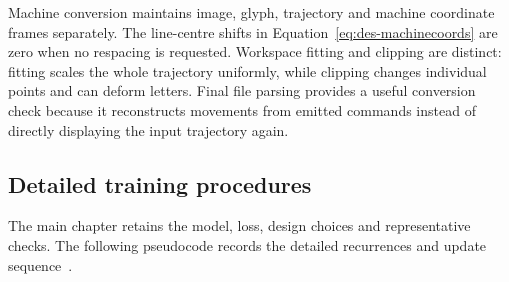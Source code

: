 Machine conversion maintains image, glyph, trajectory and machine coordinate frames separately. The line-centre shifts in Equation~\ref{eq:des-machinecoords} are zero when no respacing is requested. Workspace fitting and clipping are distinct: fitting scales the whole trajectory uniformly, while clipping changes individual points and can deform letters. Final file parsing provides a useful conversion check because it reconstructs movements from emitted commands instead of directly displaying the input trajectory again.~\cite[train.py; segment.py; style.py]{braunepipeline2026}
\FloatBarrier

\subsection{Detailed training procedures}\label{app:des-training-procedures}
The main chapter retains the model, loss, design choices and representative checks. The following pseudocode records the detailed recurrences and update sequence~\cite[train.py]{braunepipeline2026}.

\begin{designalgorithm}
\caption{Numerical CTC loss and logit gradient~\cite{brauneevidence2026,braunepipeline2026}}
\label{alg:des-ctc}
\begin{designpseudo}
\end{designpseudo}
\end{designalgorithm}

